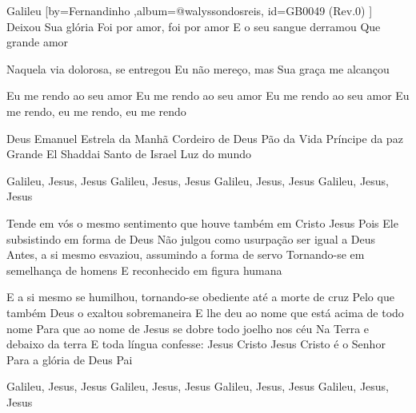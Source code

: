 \beginsong
{Galileu %
}[by={Fernandinho %
},album={@walyssondosreis},
id={GB0049 %
(Rev.0) %
}]
Deixou Sua glória
Foi por amor, foi por amor
E o seu sangue derramou
Que grande amor

Naquela via dolorosa, se entregou
Eu não mereço, mas Sua graça me alcançou

Eu me rendo ao seu amor
Eu me rendo ao seu amor
Eu me rendo ao seu amor
Eu me rendo, eu me rendo, eu me rendo

Deus Emanuel
Estrela da Manhã
Cordeiro de Deus
Pão da Vida
Príncipe da paz
Grande El Shaddai
Santo de Israel
Luz do mundo

Galileu, Jesus, Jesus
Galileu, Jesus, Jesus
Galileu, Jesus, Jesus
Galileu, Jesus, Jesus

Tende em vós o mesmo sentimento que houve também em Cristo Jesus
Pois Ele subsistindo em forma de Deus
Não julgou como usurpação ser igual a Deus
Antes, a si mesmo esvaziou, assumindo a forma de servo
Tornando-se em semelhança de homens
E reconhecido em figura humana

E a si mesmo se humilhou, tornando-se obediente até a morte de cruz
Pelo que também Deus o exaltou sobremaneira
E lhe deu ao nome que está acima de todo nome
Para que ao nome de Jesus se dobre todo joelho nos céu
Na Terra e debaixo da terra
E toda língua confesse: Jesus Cristo
Jesus Cristo é o Senhor
Para a glória de Deus Pai

Galileu, Jesus, Jesus
Galileu, Jesus, Jesus
Galileu, Jesus, Jesus
Galileu, Jesus, Jesus


